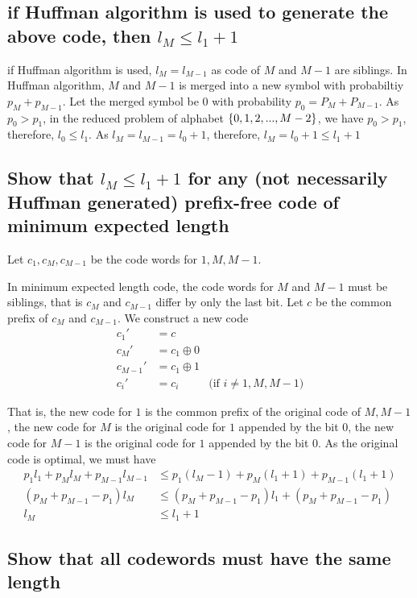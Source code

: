 \documentclass{article}
\begin{document}
\subsection{if Huffman algorithm is used to generate the above code, then $l_M \leq l_1 + 1$}

if Huffman algorithm is used, $l_M = l_{M-1}$ as code of $M$ and $M-1$ are siblings. In Huffman algorithm, $M$ and $M-1$ is merged into a new symbol with probabiltiy $p_M + p_{M-1}$. Let the merged symbol be $0$ with probability $p_0 = P_M + P_{M-1}$. As $p_0 > p_1$, in the reduced problem of alphabet $\{0, 1, 2, ..., M-2\}$, we have $p_0 > p_1$, therefore, $l_0 \leq l_1$. As $l_M = l_{M-1} = l_0 + 1$, therefore, $l_M = l_0 + 1 \leq l_1 + 1$

\subsection{Show that $l_M \leq l_1 + 1$ for any (not necessarily Huffman generated) prefix-free code of minimum expected length}

Let $c_1, c_M, c_{M-1}$ be the code words for $1, M, M-1$.

In minimum expected length code, the code words for $M$ and $M-1$ must be siblings, that is $c_M$ and $c_{M-1}$ differ by only the last bit. Let $c$ be the common prefix of $c_M$ and $c_{M-1}$. We construct a new code
\begin{align*}
    c_1' &= c \\
    c_M' &= c_1 \oplus 0 \\
    c_{M-1}' &= c_1 \oplus 1 \\
    c_i' &= c_i &\text{(if $i \neq 1, M, M-1$)}
\end{align*}

That is, the new code for $1$ is the common prefix of the original code of $M, M-1$, the new code for $M$ is the original code for $1$ appended by the bit $0$, the new code for $M-1$ is the original code for $1$ appended by the bit $0$. As the original code is optimal, we must have
\begin{align*}
    p_1 l_1 + p_M l_M + p_{M-1} l_{M-1} &\leq p_1 (l_M - 1) + p_M(l_1 + 1) + p_{M-1} (l_1 + 1) \\
    (p_M + p_{M-1} - p_1) l_M &\leq (p_M + p_{M-1} - p_1) l_1 + (p_M + p_{M-1} - p_1) \\
    l_M &\leq l_1 + 1    
\end{align*}

\subsection{Show that all codewords must have the same length}
\end{document}
